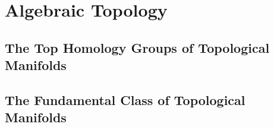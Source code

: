 \documentclass[Total.tex]{subfiles}
\begin{document}
	\chapter{Algebraic Topology}
		\section{The Top Homology Groups of Topological Manifolds}
		\section{The Fundamental Class of Topological Manifolds}
\end{document}
